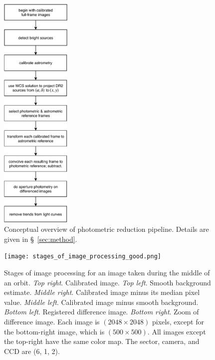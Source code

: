 \documentclass[12pt,twocolumn,tighten]{aastex62}
\begin{document}
\begin{figure}[!t]
	\begin{center}
		\leavevmode
		\includegraphics[width=0.3\textwidth]{pipelineoverview.pdf}
	\end{center}
	\vspace{-0.2cm}
	\caption{
    Conceptual overview of photometric reduction pipeline.
    Details are given in \S~\ref{sec:method}.
	\label{fig:pipeline}
	}
\end{figure}

\begin{figure}[!t]
    \begin{center}
        \leavevmode
        \texttt{[image: stages\_of\_image\_processing\_good.png]}
    \end{center}
    \vspace{-0.6cm}
    \caption{
        Stages of image processing for an image taken during the middle
        of an orbit.
        {\it Top right}. Calibrated image.
        {\it Top left}. Smooth background estimate.
        {\it Middle right}. Calibrated image minus its median pixel value.
        {\it Middle left}. Calibrated image minus smooth background.
        {\it Bottom left}. Registered difference image.
        {\it Bottom right}. Zoom of difference image.
        Each image is $(2048\times2048)$ pixels, except for the bottom-right 
        image, which is $(500\times500)$.
        All images except the top-right have the same color map.
        The sector, camera, and CCD are (6, 1, 2).
        \label{fig:stages_good}
    }
\end{figure}
\end{document}
